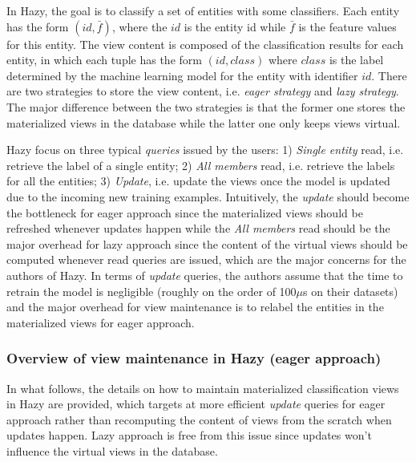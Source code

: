 In Hazy, the goal is to classify a set of entities with some classifiers. Each entity has the form $(id, \bar{f})$, where the $id$ is the entity id while $\bar{f}$ is the feature values for this entity. The view content is composed of the classification results for each entity, in which each tuple has the form $(id, class)$ where $class$ is the label determined by the machine learning model for the entity with identifier $id$. There are two strategies to store the view content, i.e. {\em eager strategy} and {\em lazy strategy}. The major difference between the two strategies is that the former one stores the materialized views in the database while the latter one only keeps views virtual.

Hazy focus on three typical {\em queries} issued by the users: 1) {\em Single entity} read, i.e. retrieve the label of a single entity; 2) {\em All members} read, i.e. retrieve the labels for all the entities; 3) {\em Update}, i.e. update the views once the model is updated due to the incoming new training examples. Intuitively, the {\em update} should become the bottleneck for eager approach since the materialized views should be refreshed whenever updates happen while the {\em All members} read should be the major overhead for lazy approach since the content of the virtual views should be computed whenever read queries are issued, which are the major concerns for the authors of Hazy. In terms of {\em update} queries, the authors assume that the time to retrain the model is negligible (roughly on the order of 100$\mu$s on their datasets) and the major overhead for view maintenance is to relabel the entities in the materialized views for eager approach. 

\subsubsection{Overview of view maintenance in Hazy (eager approach)}
In what follows, the details on how to maintain materialized classification views in Hazy are provided, which targets at more efficient {\em update} queries for eager approach rather than recomputing the content of views from the scratch when updates happen. Lazy approach is free from this issue since updates won't influence the virtual views in the database. 

